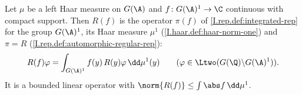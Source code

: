 Let $\mu$ be a left Haar measure on $G(\A)$ and $f\colon G(\A)^1\to\C$ continuous with compact support. Then
$R(f)$ is the operator $\pi(f)$ of \cref{I.rep.def:integrated-rep} for the group $G(\A)^1$, its Haar measure $\mu^1$
(\cref{I.haar.def:haar-norm-one}) and $\pi=R$ (\cref{I.rep.def:automorphic-regular-rep}):
\[
  R(f)\varphi=\int_{G(\A)^1}f(y)\,R(y)\varphi\,\dd\mu^1(y)\qquad(\varphi\in\Ltwo(G(\Q)\backslash G(\A)^1)).
\]
It is a bounded linear operator with $\norm{R(f)}\le\int\abs f\,\dd\mu^1$.
